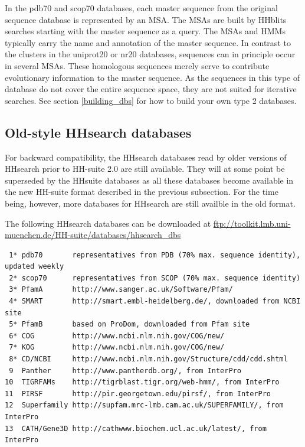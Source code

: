 \documentclass[11pt,a4paper]{article}
\begin{document}
In the pdb70 and scop70 databases, each master sequence from the original sequence database is represented by an MSA. The MSAs are built by HHblits searches starting with the master sequence as a query. The MSAs and HMMs typically carry the name and annotation of the master sequence. In contrast to the clusters in the uniprot20 or nr20 databases, sequences can in principle occur in several MSAs. These homologous sequences merely serve to contribute evolutionary information to the master sequence. As the sequences in this type of database do not cover the entire sequence space, they are not suited for iterative searches. See  section \ref{building_dbs} for how to build your own type 2 databases.


\subsection{Old-style HHsearch databases} \label{hhsearch_dbs}
For backward compatibility, the HHsearch databases read by older versions of HHsearch prior to HH-suite 2.0 are 
still available. They will at some point be superseded by the HHsuite databases as all these databases become 
available in the new HH-suite format described in the previous subsection. For the time being, however,
more databases for HHsearch are still availble in the old format.

The following HHsearch databases can be downloaded at \url{ftp://toolkit.lmb.uni-muenchen.de/HH-suite/databases/hhsearch_dbs}

\small 
\begin{verbatim}
 1* pdb70       representatives from PDB (70% max. sequence identity), updated weekly
 2* scop70      representatives from SCOP (70% max. sequence identity)
 3* PfamA       http://www.sanger.ac.uk/Software/Pfam/
 4* SMART       http://smart.embl-heidelberg.de/, downloaded from NCBI site
 5* PfamB       based on ProDom, downloaded from Pfam site
 6* COG         http://www.ncbi.nlm.nih.gov/COG/new/
 7* KOG	        http://www.ncbi.nlm.nih.gov/COG/new/
 8* CD/NCBI     http://www.ncbi.nlm.nih.gov/Structure/cdd/cdd.shtml
 9  Panther     http://www.pantherdb.org/, from InterPro
10  TIGRFAMs    http://tigrblast.tigr.org/web-hmm/, from InterPro
11  PIRSF       http://pir.georgetown.edu/pirsf/, from InterPro
12  Superfamily http://supfam.mrc-lmb.cam.ac.uk/SUPERFAMILY/, from InterPro
13  CATH/Gene3D http://cathwww.biochem.ucl.ac.uk/latest/, from InterPro 
\end{verbatim} 
\normalsize
\end{document}
